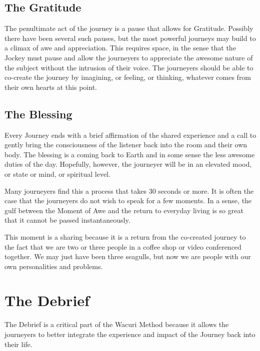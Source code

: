 \documentclass[12pt]{book}
\begin{document}
\section{The Gratitude}
					
The penultimate act of the journey is a pause that allows for Gratitude. Possibly there have been several such pauses, but the most powerful journeys may build to a climax of awe and appreciation. This requires space, in the sense that the Jockey must pause and allow the journeyers to appreciate the awesome nature of the subject without the intrusion of their voice. The journeyers should be able to co-create the journey by imagining, or feeling, or thinking, whatever comes from their own hearts at this point.

\section{The Blessing}
					
Every Journey ends with a brief affirmation of the shared experience and a call to gently bring the consciousness of the listener back into the room and their own body. The blessing is a coming back to Earth and in some sense the less awesome duties of the day. Hopefully, however, the journeyer will be in an elevated mood, or state or mind, or spiritual level.
					
Many journeyers find this a process that takes 30 seconds or more. It is often the case that the journeyers do not wish to speak for a few moments. In a sense, the gulf between the Moment of Awe and the return to everyday living is so great that it cannot be passed instantaneously.
					
This moment is a sharing because it is a return from the co-created journey to the fact that we are two or three people in a coffee shop or video conferenced together. We may just have been three seagulls, but now we are people with our own personalities and problems.
				
			
		




\chapter{The Debrief}

The Debrief is a critical part of the Wacuri Method because it allows the journeyers to better integrate the experience and impact of the Journey back into their life.
					
\end{document}
